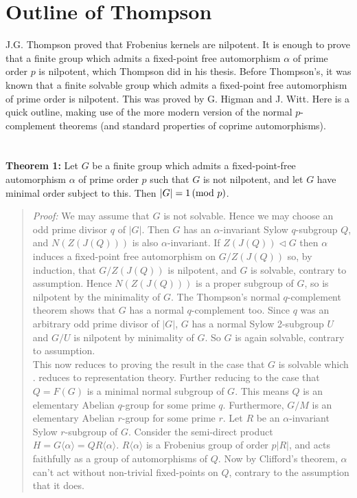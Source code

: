 \section{Outline of Thompson}
J.G. Thompson proved that Frobenius kernels are nilpotent.
It is enough to prove that a finite group which admits a fixed-point free automorphism $\alpha$
of prime order $p$ is nilpotent, which Thompson did in his thesis.
Before Thompson's, it was known that a finite solvable group which admits a fixed-point free automorphism 
of prime order is nilpotent. This was proved by G. Higman and J. Witt.
Here is a quick outline, making use of the more modern version of the normal $p$-complement theorems
(and standard properties of coprime automorphisms).\\
\\
\\
{\bf Theorem 1:}  Let $G$ be a finite group which admits a fixed-point-free automorphism 
$\alpha$ of prime order $p$ such that $G$ is not nilpotent, 
and let $G$  have minimal order subject to this. Then $|G|=1 \thinspace \textnormal{(mod } p \textnormal{)}$.
\begin{quote}
\emph{Proof:}
We may assume that $G$ is not solvable. Hence we may choose an 
odd prime divisor $q$ of $|G|$.
Then $G$ has an $\alpha$-invariant Sylow $q$-subgroup $Q$, and $N(Z(J(Q)))$
is also $\alpha$-invariant. 
If $Z(J(Q)) \lhd G$ then $\alpha$ induces a fixed-point free automorphism on 
$G/Z(J(Q))$ so, by induction, that $G/Z(J(Q))$ is nilpotent,
and $G$  is solvable, contrary to assumption.  Hence $N(Z(J(Q)))$
is a proper subgroup of $G$, so is nilpotent by the minimality of $G$.
The Thompson's normal $q$-complement theorem shows that $G$ has a normal $q$-complement too.
Since $q$ was an arbitrary odd prime divisor of $|G|$, $G$ has a normal Sylow 2-subgroup $U$ and 
$G/U$ is nilpotent by minimality of $G$. So $G$ is again solvable, contrary to assumption.
\\
This now reduces to proving the result in the case that $G$ is solvable which .
reduces to representation theory. 
Further reducing to the case that $Q=F(G)$ is a minimal normal subgroup of $G$. This means $Q$ is 
an elementary Abelian $q$-group for some prime $q$. 
Furthermore, $G/M$ is an elementary Abelian $r$-group for some prime $r$.
Let $R$ be an $\alpha$-invariant Sylow $r$-subgroup of $G$.
Consider the semi-direct product $H=G \langle \alpha \rangle= Q R \langle \alpha \rangle$.
$R\langle \alpha \rangle$ is a Frobenius group of order $p|R|$, and 
acts faithfully as a group of automorphisms of $Q$.
Now by Clifford's theorem,
$\alpha$ can't act without non-trivial fixed-points on $Q$, contrary to the assumption that it does.
\end{quote}
